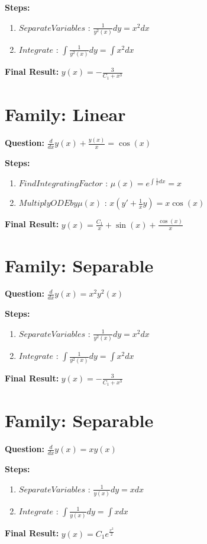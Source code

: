\documentclass{article}
\begin{document}
\textbf{Steps:}
\begin{enumerate}
\item $Separate Variables$ :  $\frac{1}{y^{2}{\left(x \right)}} dy = x^{2} dx$
\item $Integrate$ :  $\int \frac{1}{y^{2}{\left(x \right)}} dy = \int x^{2} dx$
\end{enumerate}
\textbf{Final Result:} $y{\left(x \right)} = - \frac{3}{C_{1} + x^{3}}$

\section*{Family: Linear}
\textbf{Question:} $\frac{d}{d x} y{\left(x \right)} + \frac{y{\left(x \right)}}{x} = \cos{\left(x \right)}$

\textbf{Steps:}
\begin{enumerate}
\item $Find Integrating Factor$ :  $\mu(x) = e^{\int \frac{1}{x} dx} = x$
\item $Multiply ODE by \mu(x)$ :  $x(y' + \frac{1}{x}y) = x \cos{\left(x \right)}$
\end{enumerate}
\textbf{Final Result:} $y{\left(x \right)} = \frac{C_{1}}{x} + \sin{\left(x \right)} + \frac{\cos{\left(x \right)}}{x}$

\section*{Family: Separable}
\textbf{Question:} $\frac{d}{d x} y{\left(x \right)} = x^{2} y^{2}{\left(x \right)}$

\textbf{Steps:}
\begin{enumerate}
\item $Separate Variables$ :  $\frac{1}{y^{2}{\left(x \right)}} dy = x^{2} dx$
\item $Integrate$ :  $\int \frac{1}{y^{2}{\left(x \right)}} dy = \int x^{2} dx$
\end{enumerate}
\textbf{Final Result:} $y{\left(x \right)} = - \frac{3}{C_{1} + x^{3}}$

\section*{Family: Separable}
\textbf{Question:} $\frac{d}{d x} y{\left(x \right)} = x y{\left(x \right)}$

\textbf{Steps:}
\begin{enumerate}
\item $Separate Variables$ :  $\frac{1}{y{\left(x \right)}} dy = x dx$
\item $Integrate$ :  $\int \frac{1}{y{\left(x \right)}} dy = \int x dx$
\end{enumerate}
\textbf{Final Result:} $y{\left(x \right)} = C_{1} e^{\frac{x^{2}}{2}}$
\end{document}
